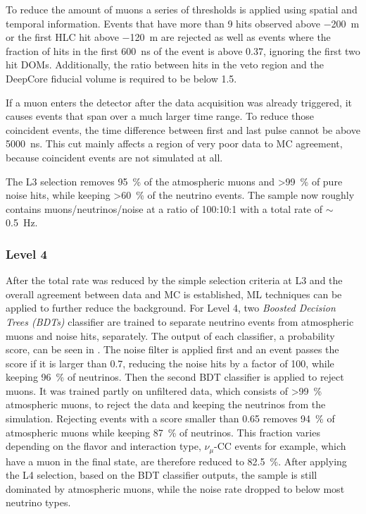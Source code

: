 To reduce the amount of muons a series of thresholds is applied using spatial and temporal information. Events that have more than 9 hits observed above \SI{-200}{\meter} or the first HLC hit above \SI{-120}{\meter} are rejected as well as events where the fraction of hits in the first \SI{600}{\nano\second} of the event is above 0.37, ignoring the first two hit DOMs. Additionally, the ratio between hits in the veto region and the DeepCore fiducial volume is required to be below 1.5.

If a muon enters the detector after the data acquisition was already triggered, it causes events that span over a much larger time range. To reduce those coincident events, the time difference between first and last pulse cannot be above \SI{5000}{\nano\second}. This cut mainly affects a region of very poor data to MC agreement, because coincident events are not simulated at all.

The L3 selection removes \SI{95}{\percent} of the atmospheric muons and >\SI{99}{\percent} of pure noise hits, while keeping >\SI{60}{\percent} of the neutrino events. The sample now roughly contains muons/neutrinos/noise at a ratio of 100:10:1 with a total rate of $\sim$\SI{0.5}{\hertz}.


\subsubsection{Level 4} 

After the total rate was reduced by the simple selection criteria at L3 and the overall agreement between data and MC is established, ML techniques can be applied to further reduce the background. For Level 4, two \textit{Boosted Decision Trees (BDTs)}  classifier are trained to separate neutrino events from atmospheric muons and noise hits, separately. The output of each classifier, a probability score, can be seen in . The noise filter is applied first and an event passes the score if it is larger than 0.7, reducing the noise hits by a factor of 100, while keeping \SI{96}{\percent} of neutrinos. Then the second BDT classifier is applied to reject muons. It was trained partly on unfiltered data, which consists of >\SI{99}{\percent} atmospheric muons, to reject the data and keeping the neutrinos from the simulation. Rejecting events with a score smaller than 0.65 removes \SI{94}{\percent} of atmospheric muons while keeping \SI{87}{\percent} of neutrinos. This fraction varies depending on the flavor and interaction type, $\nu_\mu$-CC events for example, which have a muon in the final state, are therefore reduced to \SI{82.5}{\percent}. After applying the L4 selection, based on the BDT classifier outputs, the sample is still dominated by atmospheric muons, while the noise rate dropped to below most neutrino types.

